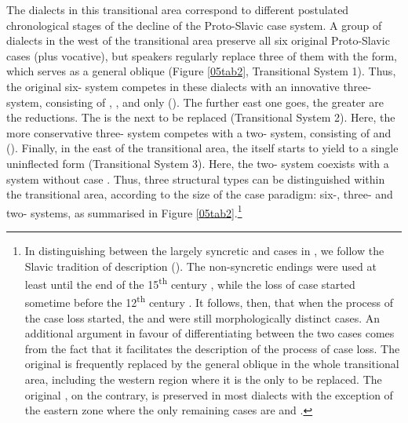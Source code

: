 \documentclass[output=paper,colorlinks,citecolor=brown]{langscibook}
\begin{document}
The dialects in this transitional area correspond to different postulated chronological stages of the decline of the Proto-Slavic case system. A group of dialects in the west of the transitional area preserve all six original Proto-Slavic cases (plus vocative), but speakers regularly replace three of them with the  form, which serves as a general oblique  (Figure \ref{05tab2}, Transitional System 1). Thus, the original six- system competes in these dialects with an innovative three- system, consisting of , , and  only (\citealt{miloradovic2003, simic1972}). The further east one goes, the greater are the reductions. The   is the next to be replaced (Transitional System 2). Here, the more conservative three- system competes with a two- system, consisting of  and  (\citealt{belic1905, ivic1956}). Finally, in the east of the transitional area, the  itself starts to yield to a single uninflected form (Transitional System 3). Here, the two- system coexists with a system without case \citep{stojkov1975, stojkov1981}. Thus, three structural  types can be distinguished within the transitional area, according to the size of the case paradigm: six-, three- and two- systems, as summarised in Figure \ref{05tab2}.\footnote{In distinguishing between the largely syncretic  and  cases in , we follow the Slavic tradition of  description (\citealt{piperklajn2013, miloradovic2003}). The non-syncretic  endings were used at least until the end of the 15\textsuperscript{th} century \citep{belic1999}, while the loss of case started sometime before the 12\textsuperscript{th} century \citep{belic1905}. It follows, then, that when the process of the case loss started, the  and  were still morphologically distinct cases. An additional argument in favour of differentiating between the two cases comes from the fact that it facilitates the description of the process of case loss. The original   is frequently replaced by the general oblique in the whole transitional area, including the western region where it is the only  to be replaced. The original  , on the contrary, is preserved in most  dialects with the exception of the eastern zone where the only remaining cases are  and  \citep{sobolev1991}.\label{05ftn3}}
\end{document}
